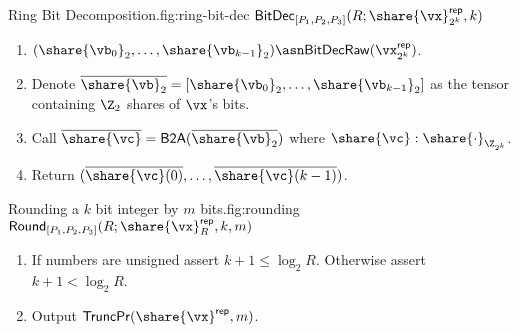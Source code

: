 \begin{Boxfig}{Ring Bit Decomposition.}{fig:ring-bit-dec}
  {$\mathsf{BitDec}_{[P_1, P_2, P_3]}(R; \share{\vx}^\mathsf{rep}_{2^k}, k)$}
  \begin{enumerate}
  \item $(\share{\vb_0}_2, \dots, \share{\vb_{k-1}}_2) \asn \mathsf{BitDecRaw}(\vx^\mathsf{rep}_{2^k})$.
  \item Denote $\overline{\share{\vb}_2} = [\share{\vb_0}_2, \dots, \share{\vb_{k-1}}_2]$ as the tensor containing $\Z_2$ shares of $\vx$'s bits.
  \item Call $\overline{\share{\vc}} = \mathsf{B2A}(\overline{\share{\vb}_2})$ where $\share{\vc}: \share{\cdot}_{\Z_{2^k}}$.
  \item Return $(\overline{\share{\vc}(0)}, \dots, \overline{\share{\vc}(k-1)})$.
\end{enumerate}
\end{Boxfig}


\begin{Boxfig}{Rounding a $k$ bit integer by $m$ bits.}{fig:rounding}
  {$\mathsf{Round}_{[P_1, P_2, P_3]}(R; \share{\vx}^\mathsf{rep}_R, k, m)$}
  \begin{enumerate}
  \item If numbers are unsigned assert $k + 1 \leq \log_2{R}$. Otherwise assert $k+1 < \log_2{R}$.
  \item Output $\mathsf{TruncPr}(\share{\vx}^\mathsf{rep}, m)$.
\end{enumerate}
\end{Boxfig}


